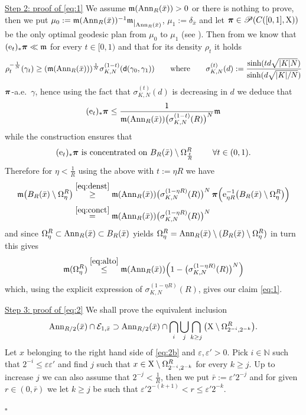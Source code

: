 \documentclass[reqno,11pt]{article}
\numberwithin{equation}{section}
\newcommand{\N}{\mathbb{N}}
\newcommand{\mm}{{\mbox{\boldmath$m$}}}
\newcommand{\ppi}{{\mbox{\boldmath$\pi$}}}
\newcommand{\sfd}{{\sf d}}
\newcommand{\restr}[1]{\lower3pt\hbox{$|_{#1}$}}
\newcommand{\eps}{\varepsilon}
\newcommand{\prob}[1]{\mathscr P(#1)}                   %
\newcommand{\e}{{\rm{e}}}                           %
\renewcommand{\mm}{\mathfrak m}                                %
\renewenvironment{proof}{\removelastskip\par\medskip   %
\noindent{\em Proof} \rm}{\penalty-20\null\hfill$\square$\par\medbreak}
\newcommand{\X}{{\rm X}}
\begin{document}
\begin{proof}
\noindent\underline{Step 2: proof of \eqref{eq:1}} We assume $\mm({\rm Ann}_{R}(\bar x))>0$ or there is nothing to prove, then we put $\mu_0:=\mm({\rm Ann}_{R}(\bar x))^{-1}\mm\restr{{\rm Ann}_{R}(\bar x)}$, 
 $\mu_1:=\delta_{\bar x}$ and let $\ppi\in \prob{C([0,1],\X)}$ be the only optimal geodesic plan from $\mu_0$ to $\mu_1$ (see \cite{GigliRajalaSturm13}). Then from \cite[Theorem 3.4]{GigliRajalaSturm13} we know that $(\e_t)_*\ppi\ll\mm$ for every $t\in[0,1)$ and that for its density $\rho_t$ it holds
\[
\rho_t^{-\frac1N}(\gamma_t)\geq (\mm({\rm Ann}_{R}(\bar x)))^{\frac1N}\sigma_{K,N}^{(1-t)}(\sfd(\gamma_0,\gamma_1))\qquad\text{where}\qquad\sigma_{K,N}^{(t)}(d):=\frac{\sinh(td\sqrt{|K|N})}{\sinh(d\sqrt{|K|/N})}
\]
$\ppi$-a.e.\ $\gamma$, hence using the fact that $\sigma_{K,N}^{(t)}(d)$ is decreasing in $d$ we deduce that
\begin{equation}
\label{eq:denst}
(\e_t)_*\ppi\leq\frac1{\mm({\rm Ann}_{R}(\bar x))\big(\sigma_{K,N}^{(1-t)}(R)\big)^N}\mm
\end{equation}
while the construction ensures that
\begin{equation}
\label{eq:conct}
(\e_t)_*\ppi\text{ is concentrated on $B_{R}(\bar x)\setminus\Omega^R_{\frac{t}{R}}$ }\qquad\forall t\in(0,1).
\end{equation}
Therefore for $\eta< \frac1{ R}$ using the above with $t:=\eta R$ we have
\begin{equation}
\label{eq:alto}
\begin{split}
\mm\big(B_{R}(\bar x)\setminus\Omega^R_\eta\big)&\stackrel{\eqref{eq:denst}}\geq {\mm({\rm Ann}_{R}(\bar x))}{\big(\sigma_{K,N}^{(1-\eta R)}(R)\big)^N}\,\ppi\Big(\e_{\eta R}^{-1}\big( B_{R}(\bar x)\setminus\Omega^R_\eta\big)\Big)\\
&\stackrel{\eqref{eq:conct}}= {\mm({\rm Ann}_{R}(\bar x))}{\big(\sigma_{K,N}^{(1-\eta R)}(R)\big)^N}
\end{split}
\end{equation}
and since $\Omega^R_\eta\subset{\rm Ann}_{R}(\bar x)\subset B_R(\bar x)$ yields $\Omega^R_\eta={\rm Ann}_{R}(\bar x)\setminus(B_{R}(\bar x)\setminus\Omega^R_\eta)$ in turn this gives
\[
\mm(\Omega^R_\eta)\stackrel{\eqref{eq:alto}}\leq \mm({\rm Ann}_{R}(\bar x))\Big(1-\big(\sigma_{K,N}^{(1-\eta R)}(R)\big)^{N}\Big)
\]
which, using the explicit expression of $\sigma_{K,N}^{(1-\eta R)}(R)$, gives   our claim \eqref{eq:1}.




\noindent\underline{Step 3: proof of \eqref{eq:2}} We shall prove the equivalent inclusion
\begin{equation}
\label{eq:2b}
{\rm Ann}_{R/2}(\bar x)\cap \mathcal E_{1,\bar x}\supset{\rm Ann}_{R/2}(\bar x)\cap  \bigcap_{i}  \bigcup_j\bigcap_{k\geq j}\big(\X\setminus\Omega^R_{2^{-i},2^{-k}}\big).
\end{equation}
Let $x$ belonging to the right hand side of \eqref{eq:2b} and  $\eps,\eps'>0$. Pick $i\in\N$   such that $2^{-i}\leq \eps{\eps'}$ and find $j$  such that $x\in\X\setminus\Omega^R_{2^{-i},2^{-k}}$ for every $k\geq j$. Up to increase $j$ we can also assume that $2^{-j}<\frac1{R}$, then we  put $\bar r:= \eps'2^{-j}$ and  for given $r\in(0,\bar r)$ we let $k\geq j$ be such that $\eps'2^{-(k+1)}< r\leq \eps'2^{-k}$.


\end{proof}
\end{document}
